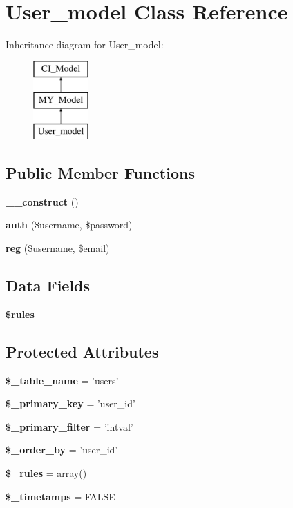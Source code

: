 \section{User\-\_\-model Class Reference}
\label{class_user__model}
Inheritance diagram for User\-\_\-model\-:\begin{figure}[H]
\begin{center}
\leavevmode
\includegraphics[height=3.000000cm]{class_user__model}
\end{center}
\end{figure}
\subsection*{Public Member Functions}
\begin{DoxyCompactItemize}
\item 
{\bf \-\_\-\-\_\-construct} ()
\item 
{\bf auth} (\$username, \$password)
\item 
{\bf reg} (\$username, \$email)
\end{DoxyCompactItemize}
\subsection*{Data Fields}
\begin{DoxyCompactItemize}
\item 
{\bf \$rules}
\end{DoxyCompactItemize}
\subsection*{Protected Attributes}
\begin{DoxyCompactItemize}
\item 
{\bf \$\-\_\-table\-\_\-name} = 'users'
\item 
{\bf \$\-\_\-primary\-\_\-key} = 'user\-\_\-id'
\item 
{\bf \$\-\_\-primary\-\_\-filter} = 'intval'
\item 
{\bf \$\-\_\-order\-\_\-by} = 'user\-\_\-id'
\item 
{\bf \$\-\_\-rules} = array()
\item 
{\bf \$\-\_\-timetamps} = F\-A\-L\-S\-E
\end{DoxyCompactItemize}


